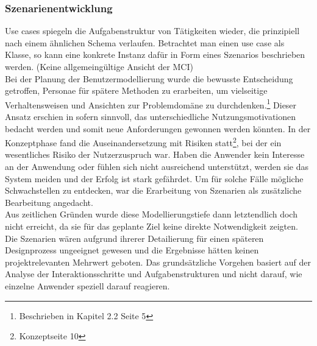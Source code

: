 \subsubsection{Szenarienentwicklung}
Use cases spiegeln die Aufgabenstruktur von Tätigkeiten wieder, die prinzipiell nach einem ähnlichen Schema verlaufen. Betrachtet man einen use case als Klasse, so kann eine konkrete Instanz dafür in Form eines Szenarios beschrieben werden. (Keine allgemeingültige Ansicht der MCI)\\ Bei der Planung der Benutzermodellierung wurde die bewusste Entscheidung getroffen, Personae für spätere Methoden zu erarbeiten, um vielseitige Verhaltensweisen und Ansichten zur Problemdomäne zu durchdenken.\footnote{Beschrieben in Kapitel 2.2 Seite 5} Dieser Ansatz erschien in sofern sinnvoll, das unterschiedliche Nutzungsmotivationen bedacht werden und somit neue Anforderungen gewonnen werden könnten. In der Konzeptphase fand die Auseinandersetzung mit Risiken statt\footnote{Konzeptseite 10}, bei der ein wesentliches Risiko der Nutzerzuspruch war. Haben die Anwender kein Interesse an der Anwendung oder fühlen sich nicht ausreichend unterstützt, werden sie das System meiden und der Erfolg ist stark gefährdet. Um für solche Fälle mögliche Schwachstellen zu entdecken, war die Erarbeitung von Szenarien als zusätzliche Bearbeitung angedacht.\\
Aus zeitlichen Gründen wurde diese Modellierungstiefe dann letztendlich doch nicht erreicht, da sie für das geplante Ziel keine direkte Notwendigkeit zeigten. Die Szenarien wären aufgrund ihrerer Detailierung für einen späteren Designprozess ungeeignet gewesen und die Ergebnisse hätten keinen projektrelevanten Mehrwert geboten. Das grundsätzliche Vorgehen basiert auf der Analyse der Interaktionsschritte und Aufgabenstrukturen und nicht darauf, wie einzelne Anwender speziell darauf reagieren.






